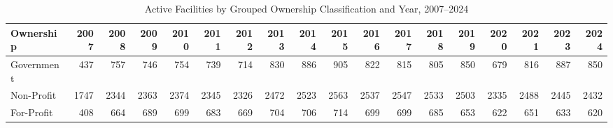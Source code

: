 \documentclass{article}
\begin{document}
\begin{landscape}

\begin{table}[htbp]
\centering

\caption{
Active Facilities by Grouped Ownership Classification and Year, 2007--2024
}

\small
\setlength{\tabcolsep}{3pt}
\begin{tabular}{lrrrrrrrrrrrrrrrrr}
\toprule
Ownership & 2007 & 2008 & 2009 & 2010 & 2011 & 2012 & 2013 & 2014 & 2015 & 2016 & 2017 & 2018 & 2019 & 2020 & 2021 & 2023 & 2024 \\
\midrule
Government & 437 & 757 & 746 & 754 & 739 & 714 & 830 & 886 & 905 & 822 & 815 & 805 & 850 & 679 & 816 & 887 & 850 \\
Non-Profit & 1747 & 2344 & 2363 & 2374 & 2345 & 2326 & 2472 & 2523 & 2563 & 2537 & 2547 & 2533 & 2503 & 2335 & 2488 & 2445 & 2432 \\
For-Profit & 408 & 664 & 689 & 699 & 683 & 669 & 704 & 706 & 714 & 699 & 699 & 685 & 653 & 622 & 651 & 633 & 620 \\
\bottomrule
\end{tabular}


\end{table}

\end{landscape}
\end{document}
